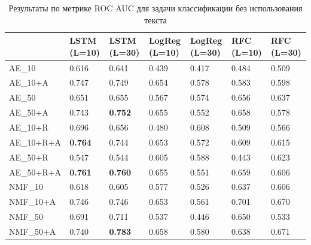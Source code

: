 \begin{center}
\begin{table}
 \begin{tabular}{||p{3.8cm}|p{1.5cm}|p{1.5cm}|p{1.5cm}|p{1.5cm}|p{1.5cm}|p{1.5cm}||} 
\hline
  & LSTM (L=10) & LSTM (L=30) & LogReg (L=10) & LogReg (L=30) & RFC (L=10) & RFC (L=30)\\ \hline\hline
AE\_10 & 0.616 & 0.641 & 0.439 & 0.417 & 0.484 & 0.509\\ \hline
AE\_10+A & 0.747 & 0.749 & 0.654 & 0.578 & 0.583 & 0.598\\ \hline
AE\_50 & 0.651 & 0.655 & 0.567 & 0.574 & 0.656 & 0.637\\ \hline
AE\_50+A & 0.743 & \textbf{0.752} & 0.655 & 0.552 & 0.658 & 0.578\\ \hline
AE\_10+R & 0.696 & 0.656 & 0.480 & 0.608 & 0.509 & 0.566\\ \hline
AE\_10+R+A & \textbf{0.764} & 0.744 & 0.653 & 0.572 & 0.609 & 0.615\\ \hline
AE\_50+R & 0.547 & 0.544 & 0.605 & 0.588 & 0.443 & 0.623\\ \hline
AE\_50+R+A & \textbf{0.761} & \textbf{0.760} & 0.655 & 0.551 & 0.659 & 0.606\\ \hline
NMF\_10 & 0.618 & 0.605 & 0.577 & 0.526 & 0.637 & 0.606\\ \hline
NMF\_10+A & 0.746 & 0.746 & 0.653 & 0.561 & 0.701 & 0.670\\ \hline
NMF\_50 & 0.691 & 0.711 & 0.537 & 0.446 & 0.650 & 0.533\\ \hline
NMF\_50+A & 0.740 & \textbf{0.783} & 0.658 & 0.580 & 0.638 & 0.671\\ \hline
 \end{tabular}
 \caption{\label{tab:clf-res-no-text} Результаты по метрике ROC AUC для задачи классификации без использования текста}
\end{table}
\end{center}

